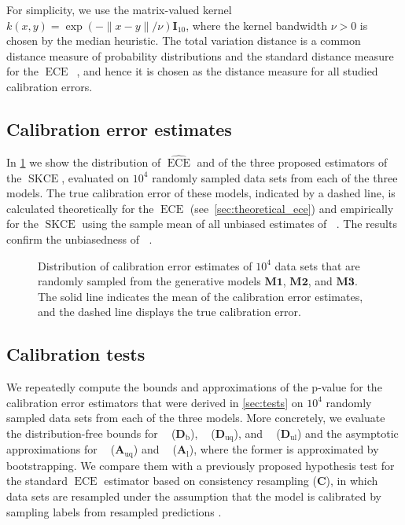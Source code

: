 \documentclass{article}
\DeclareMathOperator{\ECE}{ECE}
\DeclareMathOperator{\squaredkernelmeasure}{SKCE}
\DeclareMathOperator{\biasedestimator}{\widehat{SKCE}_b}
\DeclareMathOperator{\unbiasedestimator}{\widehat{SKCE}_{uq}}
\DeclareMathOperator{\linearestimator}{\widehat{SKCE}_{ul}}
\begin{document}
For simplicity, we use the matrix-valued kernel
$k(x, y) = \exp{(- \|x - y\| / \nu)} \mathbf{I}_{10}$, where the kernel bandwidth
$\nu > 0$ is chosen by the median heuristic. The total variation distance is a
common distance measure of probability distributions and the standard distance
measure for the
$\ECE$~\citep{guo17_calib_moder_neural_networ,vaicenavicius19_evaluat,broecker07_increas_reliab_reliab_diagr},
and hence it is chosen as the distance measure for all studied calibration
errors.

\subsection{Calibration error estimates}

In \cref{fig:errors_comparison} we show the distribution of $\widehat{\ECE}$ and
of the three proposed estimators of the $\squaredkernelmeasure$, evaluated on
$10^4$ randomly sampled data sets from each of the three models. The true
calibration error of these models, indicated by a dashed line, is calculated
theoretically for the $\ECE$ (see~\cref{sec:theoretical_ece}) and empirically
for the $\squaredkernelmeasure$ using the sample mean of all unbiased estimates
of $\unbiasedestimator$. The results confirm the unbiasedness of
$\linearestimator$.

\begin{figure}[!htbp]
  \begin{center}
    
    \caption{Distribution of calibration error estimates of $10^4$ data sets
      that are randomly sampled from the generative models $\mathbf{M1}$,
      $\mathbf{M2}$, and $\mathbf{M3}$. The solid line indicates the mean of the
      calibration error estimates, and the dashed line displays the true
      calibration error.}
    \label{fig:errors_comparison}
  \end{center}
\end{figure}

\subsection{Calibration tests}

We repeatedly compute the bounds and approximations of the p-value for the
calibration error estimators that were derived in \cref{sec:tests} on $10^4$
randomly sampled data sets from each of the three models. More concretely, we
evaluate the distribution-free bounds for $\biasedestimator$
($\mathbf{D}_{\mathrm{b}}$), $\unbiasedestimator$ ($\mathbf{D}_{\mathrm{uq}}$), and
$\linearestimator$ ($\mathbf{D}_{\mathrm{ul}}$) and the asymptotic
approximations for $\unbiasedestimator$ ($\mathbf{A}_{\mathrm{uq}}$) and
$\linearestimator$ ($\mathbf{A}_{\mathrm{l}}$), where the former is approximated
by bootstrapping. We compare them with a previously proposed hypothesis test for
the standard $\ECE$ estimator based on consistency resampling ($\mathbf{C}$), in
which data sets are resampled under the assumption that the model is calibrated
by sampling labels from resampled predictions
\citep{broecker07_increas_reliab_reliab_diagr,vaicenavicius19_evaluat}.
\end{document}
